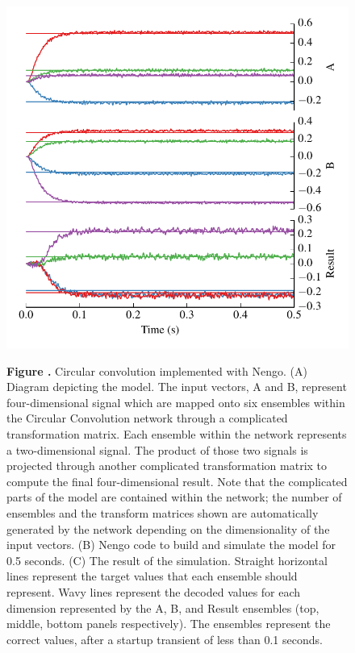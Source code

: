 \documentclass{frontiersSCNS}
\begin{document}
\begin{figure}
\begin{center}
\begin{minipage}{0.46\textwidth}
    \includegraphics[width=\textwidth]{cconv_res}
  \end{minipage}
\end{center}
 \textbf{\label{fig:cconv} Figure
   .}{
   Circular convolution implemented with Nengo.
   (A) Diagram depicting the model.
   The input vectors, A and B, represent four-dimensional signal
   which are mapped onto six ensembles within the
   Circular Convolution network through
   a complicated transformation matrix.
   Each ensemble within the network represents a
   two-dimensional signal. The product of those two signals
   is projected through another complicated transformation matrix
   to compute the final four-dimensional result.
   Note that the complicated parts of the model
   are contained within the network;
   the number of ensembles and the transform matrices shown
   are automatically generated by the network depending on
   the dimensionality of the input vectors.
   (B) Nengo code to build and simulate the model
   for 0.5 seconds.
   (C) The result of the simulation.
   Straight horizontal lines represent
   the target values that each ensemble
   should represent.
   Wavy lines represent the decoded values
   for each dimension represented by the
   A, B, and Result ensembles
   (top, middle, bottom panels respectively).
   The ensembles represent the correct values,
   after a startup transient of less than 0.1 seconds.}
\end{figure}
\end{document}
